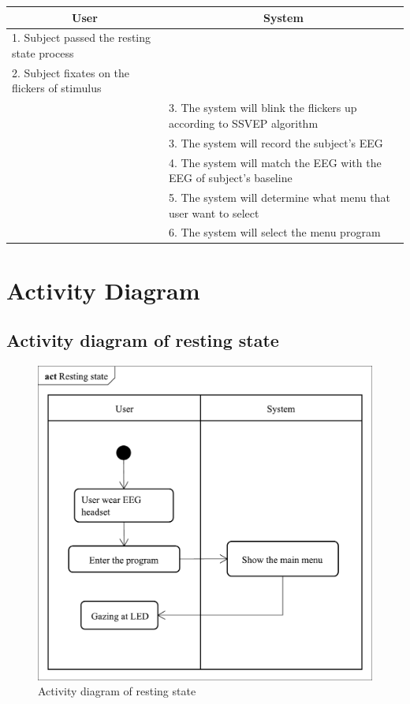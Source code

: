 \begin{itemize}
\begin{description}
{\begin{tabular}{| m{.47\linewidth} | m{.47\linewidth} |}
			\hline 
			\multicolumn{1}{|c}{\textbf{User}} & 
  			\multicolumn{1}{|c|}{\textbf{System}}\\
			\hline 
			1. Subject passed the resting state process &   \\
			\hline 
			2. Subject fixates on the flickers of stimulus   &   \\
            \hline 
			& 3. The system will blink the flickers up according to SSVEP algorithm \\
			\hline 
			& 3. The system will record the subject’s EEG \\
			\hline 
			& 4. The system will match the EEG with the EEG of subject’s baseline  \\
			\hline
			& 5. The system will determine what menu that user want to select \\
			\hline
			& 6. The system will select the menu program\\
			\hline
			
		\end{tabular}
	}
	
\end{description}
\end{itemize}


\newpage
\section{Activity Diagram}


\subsection{Activity diagram of resting state}

\begin{figure}[ht]
\centering \includegraphics[scale=0.31]{chapter4/Rest.pdf}
\caption{Activity diagram of resting state}
\end{figure}



